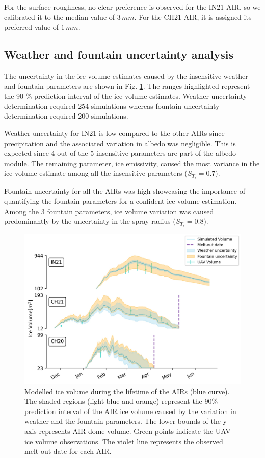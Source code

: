 \documentclass[utf8]{frontiersSCNS}
\begin{document}
For the surface roughness, no clear preference is observed for the IN21 AIR, so we calibrated it to the median
value of $3 \, mm$. For the CH21 AIR, it is assigned its preferred value of $1 \, mm$.

\subsection{Weather and fountain uncertainty analysis}

The uncertainty in the ice volume estimates caused by the insensitive weather and fountain parameters are shown in
Fig. \ref{fig:results}. The ranges highlighted represent the 90 \% prediction interval of the ice volume estimates.
Weather uncertainty determination required 254 simulations whereas fountain uncertainty determination required 200 simulations.

Weather uncertainty for IN21 is low compared to the other AIRs since precipitation and the associated variation in
albedo was negligible. This is expected since 4 out of the 5 insensitive parameters are part of the albedo module.
The remaining parameter, ice emissivity, caused the most variance in the ice volume estimate among all the
insensitive parameters ($S_{T_{i}} = 0.7$).

Fountain uncertainty for all the AIRs was high showcasing the importance of quantifying the fountain parameters for
a confident ice volume estimation. Among the 3 fountain parameters, ice volume variation was caused predominantly
by the uncertainty in the spray radius ($S_{T_{i}} = 0.8$).

\begin{figure}
	\begin{center}
		\includegraphics[width=\linewidth]{Figures/icev_results.jpg}
	\end{center}
	\caption{Modelled ice volume during the lifetime of the AIRs (blue curve). The shaded regions (light blue and orange)
		represent the 90\% prediction interval of the AIR ice volume caused by the variation in weather and the fountain parameters.
		The lower bounds of the y-axis represents AIR dome volume. Green points indicate the UAV ice volume observations.
		The violet line represents the observed melt-out date for each AIR.  }

	\label{fig:results}
\end{figure}
\end{document}
